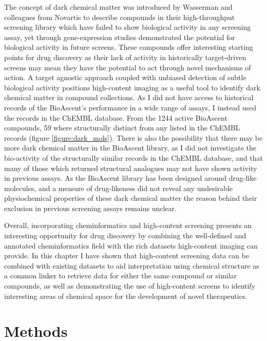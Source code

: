 \documentclass[a4paper,11pt,twoside,openright]{scrbook}
\begin{document}
The concept of dark chemical matter was introduced by Wasserman and colleagues from Novartis to describe compounds in 
their high-throughput screening library which have failed to show biological activity in any screening assay, yet 
through gene-expression studies demonstrated the potential for biological activity in future screens. 
\cite{Wassermann2015}
These compounds offer interesting starting points for drug discovery as their lack of activity in historically 
target-driven screens may mean they have the potential to act through novel mechanisms of action.
A target agnostic approach coupled with unbiased detection of subtle biological activity positions high-content imaging 
as a useful tool to identify dark chemical matter in compound collections.
As I did not have access to historical records of the BioAscent's performance in a wide range of assays, I instead used 
the records in the ChEMBL database.
From the 1244 active BioAscent compounds, 59 where structurally distinct from any listed in the ChEMBL records (figure 
\ref{figure:dark_mols}).
There is also the possibility that there may be more dark chemical matter in the BioAscent library, as I did not 
investigate the bio-activity of the structurally similar records in the ChEMBL database, and that many of those which 
returned structural analogues may not have shown activity in previous assays.
As the BioAscent library has been designed around drug-like molecules, and a measure of drug-likeness did not reveal 
any undesirable physiochemical properties of these dark chemical matter the reason behind their exclusion in previous 
screening assays remains unclear.

Overall, incorporating cheminformatics and high-content screening presents an interesting opportunity for drug 
discovery by combining the well-defined and annotated cheminformatics field with the rich datasets high-content imaging 
can provide.
In this chapter I have shown that high-content screening data can be combined with existing datasets to aid 
interpretation using chemical structure as a common linker to retrieve data for either the same compound or similar 
compounds, as well as demonstrating the use of high-content screens to identify interesting areas of chemical space for 
the development of novel therapeutics.




\section{Methods}
\end{document}
